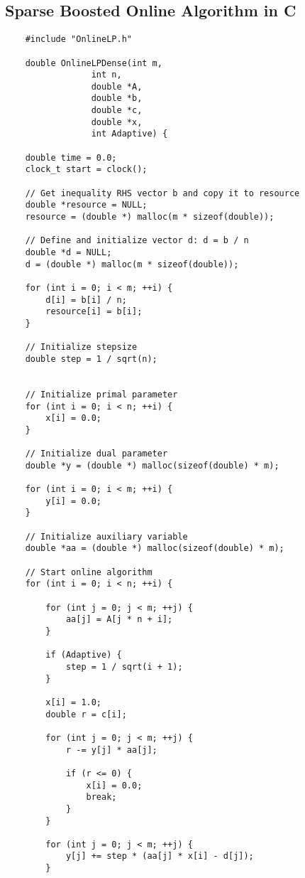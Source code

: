 \documentclass{article}
\begin{document}
\subsection{Sparse Boosted Online Algorithm in C}

\begin{lstlisting}
    #include "OnlineLP.h"
    
    double OnlineLPDense(int m, 
     			 int n, 
     			 double *A, 
     			 double *b, 
     			 double *c, 
     			 double *x, 
     			 int Adaptive) {
    
    double time = 0.0;
    clock_t start = clock();
    
    // Get inequality RHS vector b and copy it to resource
    double *resource = NULL;
    resource = (double *) malloc(m * sizeof(double));
    
    // Define and initialize vector d: d = b / n
    double *d = NULL;
    d = (double *) malloc(m * sizeof(double));
    
    for (int i = 0; i < m; ++i) {
        d[i] = b[i] / n;
        resource[i] = b[i];
    }
    
    // Initialize stepsize
    double step = 1 / sqrt(n);
    
    
    // Initialize primal parameter
    for (int i = 0; i < n; ++i) {
        x[i] = 0.0;
    }
    
    // Initialize dual parameter
    double *y = (double *) malloc(sizeof(double) * m);
    
    for (int i = 0; i < m; ++i) {
        y[i] = 0.0;
    }
    
    // Initialize auxiliary variable
    double *aa = (double *) malloc(sizeof(double) * m);
    
    // Start online algorithm
    for (int i = 0; i < n; ++i) {
        
        for (int j = 0; j < m; ++j) {
            aa[j] = A[j * n + i];
        }
        
        if (Adaptive) {
            step = 1 / sqrt(i + 1);
        }
        
        x[i] = 1.0;
        double r = c[i];
        
        for (int j = 0; j < m; ++j) {
            r -= y[j] * aa[j];
            
            if (r <= 0) {
                x[i] = 0.0;
                break;
            }
        }
        
        for (int j = 0; j < m; ++j) {
            y[j] += step * (aa[j] * x[i] - d[j]);
        }
        

\end{lstlisting}
\end{document}

